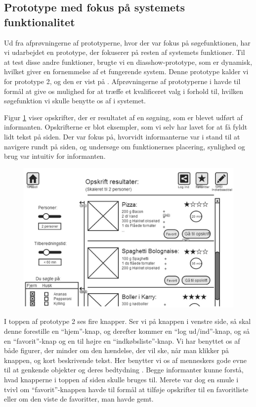 \subsection{Prototype med fokus på systemets funktionalitet}
\label{subsec:prototype2}

Ud fra afprøvningerne af prototyperne, hvor der var fokus på søgefunktionen, har vi udarbejdet en prototype, der fokuserer på resten af systemets funktioner. Til at test disse andre funktioner, brugte vi en diasshow-prototype, som er dynamisk, hvilket giver en fornemmelse af et fungerende system. Denne prototype kalder vi for prototype 2, og den er vist på . Afprøvningerne af prototyperne i  havde til formål at give os mulighed for at træffe et kvalificeret valg i forhold til, hvilken søgefunktion vi skulle benytte os af i systemet. 

Figur \ref{fig:prototype2design} viser opskrifter, der er resultatet af en søgning, som er blevet udført af informanten. Opskrifterne er blot eksempler, som vi selv har lavet for at få fyldt lidt tekst på siden. Der var fokus på, hvorvidt informanterne var i stand til at navigere rundt på siden, og undersøge om funktionernes placering, synlighed og brug var intuitiv for informanten.

\begin{figure}[H]
	\centering
	\includegraphics[scale=0.7]{billeder/prototyper/prototype2.png}
	\label{fig:prototype2design}
\end{figure}

I toppen af prototype 2 ses fire knapper. Ser vi på knappen i venstre side, så skal denne forestille en ``hjem''-knap, og derefter kommer en ``log ud/ind''-knap, og så en ``favorit''-knap og en til højre en ``indkøbsliste''-knap. Vi har benyttet os af både figurer, der minder om den hændelse, der vil ske, når man klikker på knappen, og kort beskrivende tekst. Her benytter vi os af menneskers gode evne til at genkende objekter og deres bedtydning \cite[p. ~340]{deb}. Begge informanter kunne forstå, hvad knapperne i toppen af siden skulle bruges til. Merete var dog en smule i tvivl om ``favorit''-knappen havde til formål at tilføje opskrifter til en favoritliste eller om den viste de favoritter, man havde gemt.

